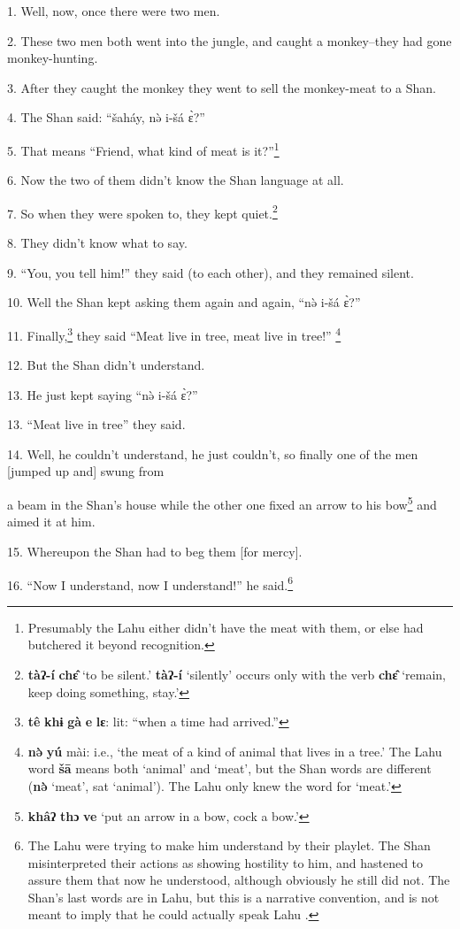 \setcounter{footnote}{0}

1. Well, now, once there were two men.

2. These two men both went into the jungle, and caught a monkey--they had gone monkey-hunting.

3. After they caught the monkey they went to sell the monkey-meat to a Shan.

4. The Shan said: ``šaháy, nə̀ i-šá ɛ̀?''

5. That means ``Friend, what kind of meat is it?''\footnote{Presumably the Lahu either didn't have the meat with them, or else had butchered it beyond recognition.}

6. Now the two of them didn't know the Shan language at all.

7. So when they were spoken to, they kept quiet.\footnote{\textbf{tàʔ-í} \textbf{chɛ̂} `to be silent.' \textbf{tàʔ-í} `silently' occurs only with the verb \textbf{chɛ̂} `remain, keep doing something, stay.'}

8. They didn't know what to say.

9. ``You, you tell him!'' they said (to each other), and they remained
silent.

10. Well the Shan kept asking them again and again, ``nə̀ i-šá ɛ̀?''

11. Finally,\footnote{\textbf{tê} \textbf{khɨ} \textbf{gà} \textbf{e} \textbf{lɛ}: lit: ``when a time had arrived.''} they said ``Meat live in tree, meat live in tree!''
\footnote{\textbf{nə̀} \textbf{yú} mài: i.e., `the meat of a kind of animal that lives in a tree.' The Lahu word \textbf{šā} means both `animal' and `meat', but the Shan words are different (\textbf{nə̀} `meat', sat `animal'). The Lahu only knew the word for `meat.'}

12. But the Shan didn't understand.

13. He just kept saying ``nə̀ i-šá ɛ̀?''

13. ``Meat live in tree'' they said.

14. Well, he couldn't understand, he just couldn't, so finally one of the men [jumped
up and] swung from

a beam in the Shan's house while the other one fixed an arrow to his bow\footnote{\textbf{khâʔ} \textbf{thɔ} \textbf{ve} `put an arrow in a bow, cock a bow.'} and
aimed it at him.

15. Whereupon the Shan had to beg them [for mercy].

16. ``Now I understand, now I understand!'' he said.\footnote{The Lahu were trying to make him understand by their playlet. The Shan misinterpreted their actions as showing hostility to him, and hastened to assure them that now he understood, although obviously he still did not. The Shan's last words are in Lahu, but this is a narrative convention, and is not meant to imply that he could actually speak Lahu .}

